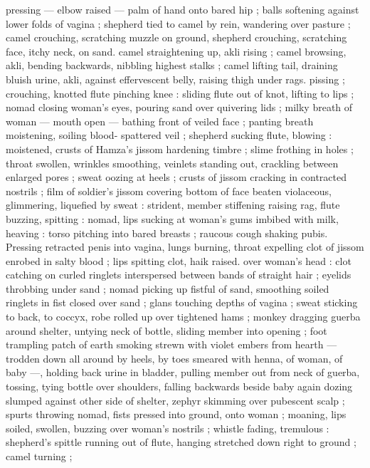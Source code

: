 pressing --- elbow raised --- palm of hand onto bared hip ; balls 
softening against lower folds of vagina ; shepherd tied to camel by 
rein, wandering over pasture ; camel crouching, scratching muzzle on 
ground, shepherd crouching, scratching face, itchy neck, on sand. 
camel straightening up, akli rising ; camel browsing, akli, bending 
backwards, nibbling highest stalks ; camel lifting tail, draining bluish 
urine, akli, against effervescent belly, raising thigh under rags. 
pissing ; crouching, knotted flute pinching knee : sliding flute out of 
knot, lifting to lips ; nomad closing woman's eyes, pouring sand over 
quivering lids ; milky breath of woman --- mouth open --- bathing 
front of veiled face ; panting breath moistening, soiling blood- 
spattered veil ; shepherd sucking flute, blowing : moistened, crusts 
of Hamza's jissom hardening timbre ; slime frothing in holes ; throat 
swollen, wrinkles smoothing, veinlets standing out, crackling 
between enlarged pores ; sweat oozing at heels ; crusts of jissom 
cracking in contracted nostrils ; film of soldier's jissom covering 
bottom of face beaten violaceous, glimmering, liquefied by sweat : 
strident, member stiffening raising rag, flute buzzing, spitting : 
nomad, lips sucking at woman's gums imbibed with milk, heaving : 
torso pitching into bared breasts ; raucous cough shaking pubis. 
Pressing retracted penis into vagina, lungs burning, throat expelling 
clot of jissom enrobed in salty blood ; lips spitting clot, haik raised. 
over woman's head : clot catching on curled ringlets interspersed 
between bands of straight hair ; eyelids throbbing under sand ; 
nomad picking up fistful of sand, smoothing soiled ringlets in fist 
closed over sand ; glans touching depths of vagina ; sweat sticking 
to back, to coccyx, robe rolled up over tightened hams ; monkey 
dragging guerba around shelter, untying neck of bottle, sliding 
member into opening ; foot trampling patch of earth smoking strewn 
with violet embers from hearth --- trodden down all around by heels, 
by toes smeared with henna, of woman, of baby ---, holding back 
urine in bladder, pulling member out from neck of guerba, tossing, 
tying bottle over shoulders, falling backwards beside baby again 
dozing slumped against other side of shelter, zephyr skimming over 
pubescent scalp ; spurts throwing nomad, fists pressed into ground, 
onto woman ; moaning, lips soiled, swollen, buzzing over woman's 
nostrils ; whistle fading, tremulous : shepherd's spittle running out 
of flute, hanging stretched down right to ground ; camel turning ; 
